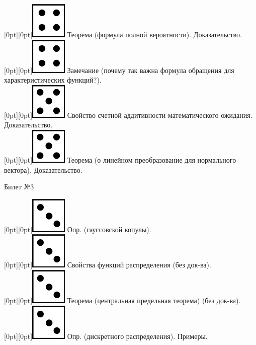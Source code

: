 \documentclass[10pt]{article}
\begin{document}
\raisebox{-1pt}[0pt][0pt]{\includegraphics[width=0.02\linewidth]{4.png}} Теорема (формула полной вероятности). Доказательство. \\

\raisebox{-1pt}[0pt][0pt]{\includegraphics[width=0.02\linewidth]{4.png}} Замечание (почему так важна формула обращения для характеристических функций?). \\

\raisebox{-1pt}[0pt][0pt]{\includegraphics[width=0.02\linewidth]{5.png}}  Свойство счетной аддитивности математического ожидания. Доказательство. \\

\raisebox{-1pt}[0pt][0pt]{\includegraphics[width=0.02\linewidth]{5.png}} Теорема (о линейном преобразование для нормального вектора). Доказательство. \\

\begin{center} {\Large Билет №3} \end{center} 

\raisebox{-1pt}[0pt][0pt]{\includegraphics[width=0.02\linewidth]{3.png}} Опр. (гауссовской копулы). \\

\raisebox{-1pt}[0pt][0pt]{\includegraphics[width=0.02\linewidth]{3.png}} Свойства функций распределения (без док-ва). \\

\raisebox{-1pt}[0pt][0pt]{\includegraphics[width=0.02\linewidth]{3.png}} Теорема (центральная предельная теорема) (без док-ва). \\

\raisebox{-1pt}[0pt][0pt]{\includegraphics[width=0.02\linewidth]{3.png}} Опр. (дискретного распределения). Примеры. \\
\end{document}
